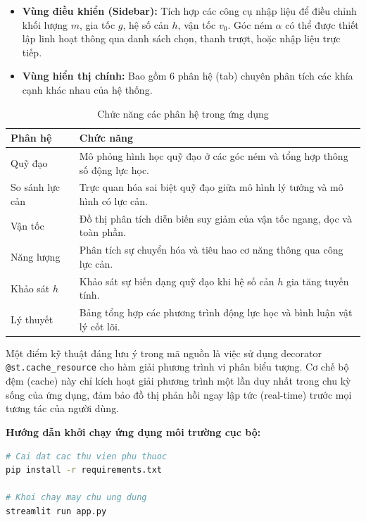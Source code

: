 \begin{itemize}[nosep]
    \item \textbf{Vùng điều khiển (Sidebar):} Tích hợp các công cụ nhập liệu để điều chỉnh khối lượng $m$, gia tốc $g$, hệ số cản $h$, vận tốc $v_0$. Góc ném $\alpha$ có thể được thiết lập linh hoạt thông qua danh sách chọn, thanh trượt, hoặc nhập liệu trực tiếp.
    \item \textbf{Vùng hiển thị chính:} Bao gồm 6 phân hệ (tab) chuyên phân tích các khía cạnh khác nhau của hệ thống.
\end{itemize}

\begin{table}[H]
\centering
\caption{Chức năng các phân hệ trong ứng dụng}
\begin{tabularx}{\textwidth}{|l|X|}
\hline
\textbf{Phân hệ} & \textbf{Chức năng} \\
\hline
Quỹ đạo & Mô phỏng hình học quỹ đạo ở các góc ném và tổng hợp thông số động lực học. \\
\hline
So sánh lực cản & Trực quan hóa sai biệt quỹ đạo giữa mô hình lý tưởng và mô hình có lực cản. \\
\hline
Vận tốc & Đồ thị phân tích diễn biến suy giảm của vận tốc ngang, dọc và toàn phần. \\
\hline
Năng lượng & Phân tích sự chuyển hóa và tiêu hao cơ năng thông qua công lực cản. \\
\hline
Khảo sát $h$ & Khảo sát sự biến dạng quỹ đạo khi hệ số cản $h$ gia tăng tuyến tính. \\
\hline
Lý thuyết & Bảng tổng hợp các phương trình động lực học và bình luận vật lý cốt lõi. \\
\hline
\end{tabularx}
\end{table}

Một điểm kỹ thuật đáng lưu ý trong mã nguồn là việc sử dụng decorator \texttt{@st.cache\_resource} cho hàm giải phương trình vi phân biểu tượng. Cơ chế bộ đệm (cache) này chỉ kích hoạt giải phương trình một lần duy nhất trong chu kỳ sống của ứng dụng, đảm bảo đồ thị phản hồi ngay lập tức (real-time) trước mọi tương tác của người dùng.

\textbf{Hướng dẫn khởi chạy ứng dụng môi trường cục bộ:}
\begin{lstlisting}[style=pythonstyle, caption={Tập lệnh cài đặt và khởi chạy ứng dụng}, language=bash]
# Cai dat cac thu vien phu thuoc
pip install -r requirements.txt

# Khoi chay may chu ung dung
streamlit run app.py
\end{lstlisting}

